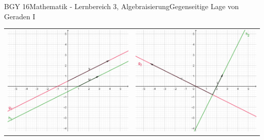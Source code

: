 \documentclass[oneside,openany,headings=optiontotoc,11pt,numbers=noenddot]{scrreprt}
\begin{document}
	\begin{worksheet}{BGY 16}{Mathematik - Lernbereich 3, Algebraisierung}{Gegenseitige Lage von Geraden I}
				
		\begin{framed}
			\noindent
			\begin{center}
				\begin{tabularx}{\textwidth}{X|X}
					\includegraphics[scale=0.33]{Bilder/ghParallel.jpg} & \includegraphics[scale=0.33]{Bilder/ghOrthogonal.jpg}\\

\end{tabularx}
\end{center}
\end{framed}
\end{worksheet}
\end{document}
